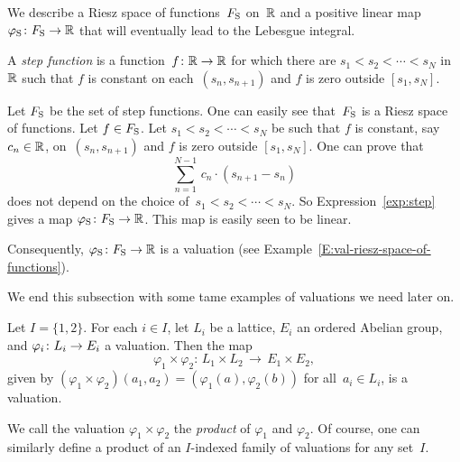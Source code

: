 \documentclass[main.tex]{subfiles}
\begin{document}
%
%
\begin{ex}
\label{E:sint-val}
We  describe a Riesz space
of functions~$F_{\mathrm{S}}$ on~$\mathbb{R}$
and a positive linear map~$\varphi_{\mathrm{S}}\colon F_{\mathrm{S}}\rightarrow \mathbb{R}$
that will eventually lead to the Lebesgue integral.

A \emph{step function} is a function~$f\colon \mathbb{R}\rightarrow\mathbb{R}$
for which there are $s_1 < s_2 <\dotsb <s_N$ in~$\mathbb{R}$
such that $f$ is constant on each~$(s_n,s_{n+1})$
and $f$ is zero outside $[s_1,s_N]$.

Let $F_{\mathrm{S}}$ be the set of step functions.
One can easily see that~$F_{\mathrm{S}}$ is a Riesz space of functions.
Let $f\in F_{\mathrm{S}}$.
Let $s_1 < s_2 <\dotsb <s_N$
be such that $f$ is constant, say $c_n\in \mathbb{R}$,
 on~$(s_n,s_{n+1})$
and $f$ is zero outside $[s_1,s_N]$.
One can prove that 
\begin{equation}
\label{exp:step}
\sum_{n=1}^{N-1} \, c_n\cdot(s_{n+1} - s_n)
\end{equation}
does not depend on the choice
of~$s_1 < s_2 <\dotsb <s_N$.
So Expression~\eqref{exp:step}
gives a map $\varphi_{\mathrm{S}} \colon F_{\mathrm{S}} \rightarrow \mathbb{R}$.
This map is easily seen to be linear.

Consequently, $\varphi_{\mathrm{S}}\colon F_{\mathrm{S}}\rightarrow \mathbb{R}$
is a valuation (see Example~\ref{E:val-riesz-space-of-functions}).
\end{ex}

\noindent
We end this subsection
with some tame examples of valuations we 
need later on.
\begin{ex}
\label{E:val-product}
Let $I=\{ 1,2\}$.
For each $i\in I$, 
let $L_i$ be a lattice,
$E_i$ an ordered Abelian group,
and $\varphi_i \colon L_i \rightarrow E_i$
a valuation.
Then 
the map 
\begin{equation*}
\varphi_1 \times \varphi_2 \colon \,
L_1 \times L_2 \,\longrightarrow\, E_1 \times E_2,
\end{equation*}
given by $(\varphi_1 \times\varphi_2)(a_1,a_2) = (\varphi_1(a),\varphi_2(b))$
for all~$a_i\in L_i$, is a valuation.

We call the valuation $\varphi_1 \times \varphi_2$
the \emph{product} of $\varphi_1$ and $\varphi_2$.
Of course,
one can similarly define a product of an $I$-indexed family
of valuations for any set~$I$.
\end{ex}
\end{document}
